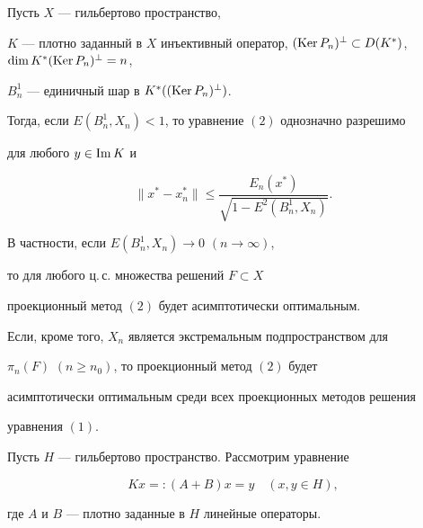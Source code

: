 \begin{thm}


Пусть $X$ --- гильбертово пространство,


$K$ --- плотно заданный в $X$ инъективный оператор, $(\Ker P_n)^\bot


\subset D(K^*)$, $\dim K^*(\Ker P_n)^\bot=n$,


$B_n^1$ --- единичный шар в $K^*((\operatorname{Ker} P_n)^\bot)$.


Тогда, если $E(B_n^1,X_n)<1$, то уравнение $(2)$ однозначно разрешимо


для любого $y\in \operatorname{Im} K$ и


$$


\|x^* -x^*_n\| \leq \frac{E_n(x^*)}{\sqrt{1-E^2(B_n^1,X_n)}}.


$$


В частности, если $E(B_n^1,X_n) \rightarrow 0$ $(n\rightarrow \infty)$,


то для любого ц.\,с. множества решений $F\subset X$


проекционный метод $(2)$ будет асимптотически оптимальным.


Если, кроме того, $X_n$ является экстремальным подпространством для


$\pi_n(F)$ $(n\geq n_0)$, то проекционный метод $(2)$ будет


асимптотически оптимальным среди всех проекционных методов решения


уравнения $(1)$.


\end{thm}





Пусть $H$ --- гильбертово пространство. Рассмотрим уравнение


\begin{equation}


Kx=: (A+B)x=y\quad (x,y \in H),


\end{equation}


где $A$ и $B$ --- плотно заданные в $H$ линейные операторы.





